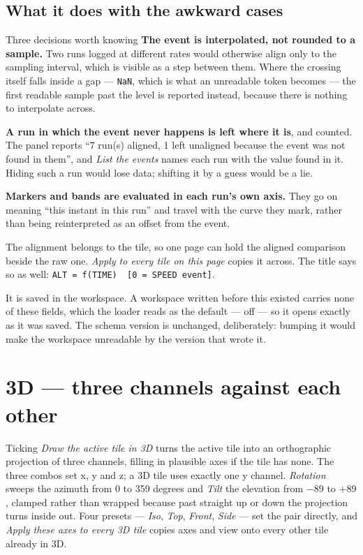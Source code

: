 \documentclass[11pt,a4paper,oneside]{report}
\newcommand{\code}[1]{\texttt{#1}}
\begin{document}
\subsection*{What it does with the awkward cases}

\begin{aoenote}{Three decisions worth knowing}
\textbf{The event is interpolated, not rounded to a sample.} Two runs logged at
different rates would otherwise align only to the sampling interval, which is
visible as a step between them. Where the crossing itself falls inside a gap
--- \code{NaN}, which is what an unreadable token becomes --- the first
readable sample past the level is reported instead, because there is nothing to
interpolate across.

\textbf{A run in which the event never happens is left where it is}, and
counted. The panel reports ``7 run(s) aligned, 1 left unaligned because the
event was not found in them'', and \emph{List the events} names each run with
the value found in it. Hiding such a run would lose data; shifting it by a
guess would be a lie.

\textbf{Markers and bands are evaluated in each run's own axis.} They go on
meaning ``this instant in this run'' and travel with the curve they mark,
rather than being reinterpreted as an offset from the event.
\end{aoenote}

The alignment belongs to the tile, so one page can hold the aligned comparison
beside the raw one. \emph{Apply to every tile on this page} copies it across.
The title says so as well: \code{ALT = f(TIME)~~[0 = SPEED event]}.

It is saved in the workspace. A workspace written before this existed carries
none of these fields, which the loader reads as the default --- off --- so it
opens exactly as it was saved. The schema version is unchanged, deliberately:
bumping it would make the workspace unreadable by the version that wrote it.

\section{3D --- three channels against each other}

Ticking \emph{Draw the active tile in 3D} turns the active tile into an
orthographic projection of three channels, filling in plausible axes if the tile
has none. The three combos set x, y and z; a 3D tile uses exactly one y channel.
\emph{Rotation} sweeps the azimuth from 0 to 359 degrees and \emph{Tilt} the
elevation from $-89$ to $+89$, clamped rather than wrapped because past straight
up or down the projection turns inside out. Four presets --- \emph{Iso},
\emph{Top}, \emph{Front}, \emph{Side} --- set the pair directly, and \emph{Apply
these axes to every 3D tile} copies axes and view onto every other tile already
in 3D.
\end{document}
